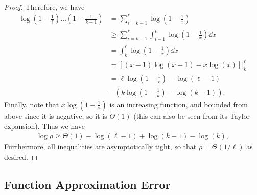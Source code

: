 \documentclass[../hippo.tex]{subfiles}
\begin{document}
\begin{proof}
  Therefore, we have
  \begin{align*}
    \log \left(1 - \frac{1}{\ell}\right) \dots \left(1 - \frac{1}{k+1}\right)
    &= \sum_{i=k+1}^\ell \log (1 - \frac{1}{i})
    \\
    &\ge \sum_{i=k+1}^\ell \int_{i-1}^i \log \left(1 - \frac{1}{x}\right) \dd x
    \\
    &= \int_{k}^\ell \log \left(1 - \frac{1}{x}\right) \dd x
    \\
    &= \left[ (x-1)\log(x-1) - x\log(x) \right] \big|_{k}^{\ell}
    \\
    &= \ell \log \left( 1-\frac{1}{\ell} \right) - \log(\ell-1)
    \\& - \left( k \log \left( 1-\frac{1}{k} \right) - \log(k-1) \right)
    .
  \end{align*}
  Finally, note that $x \log \left( 1 - \frac{1}{x} \right)$ is an increasing function, and bounded from above since it is negative, so it is $\Theta(1)$ (this can also be seen from its Taylor expansion).
  Thus we have
  \begin{align*}
    \log \rho \ge \Theta(1) - \log(\ell-1) + \log(k-1) - \log(k),
  \end{align*}
  Furthermore, all inequalities are asymptotically tight, so that $\rho = \Theta(1 / \ell)$ as desired.
  
\end{proof}




\subsection{Function Approximation Error}
\end{document}
